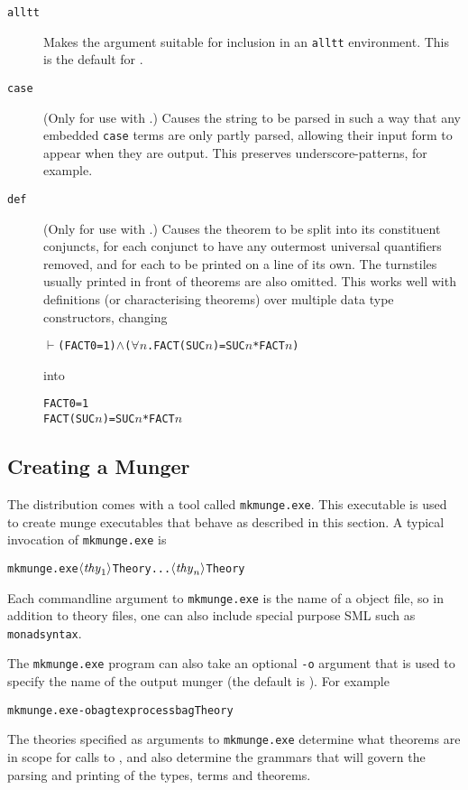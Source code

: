 \begin{description}
\item[\texttt{alltt}] Makes the argument suitable for inclusion in an \texttt{alltt} environment.
%
This is the default for \holthm.
\item[\texttt{case}] (Only for use with \holtm.)
%
Causes the string to be parsed in such a way that any embedded \texttt{case} terms are only partly parsed, allowing their input form to appear when they are output.
%
This preserves underscore-patterns, for example.
\item[\texttt{def}] (Only for use with \holthm.)
%
Causes the theorem to be split into its constituent conjuncts, for each conjunct to have any outermost universal quantifiers removed, and for each to be printed on a line of its own.
%
The turnstiles usually printed in front of theorems are also omitted.
%
This works well with definitions (or characterising theorems) over multiple data type constructors, changing
\begin{alltt}
\(\vdash\) (FACT 0 = 1) \(\land\) (\(\forall\)\ensuremath{n}. FACT (SUC \ensuremath{n}) = SUC \ensuremath{n} * FACT \ensuremath{n})
\end{alltt}
into
\begin{alltt}
   FACT 0 = 1
   FACT (SUC \ensuremath{n}) = SUC \ensuremath{n} * FACT \ensuremath{n}
\end{alltt}
\end{description}


\subsection{Creating a Munger}
\label{sec:munger-creation}

\newcommand{\mkmunge}{\texttt{mkmunge.exe}}
%
The \HOL{} distribution comes with a tool called \mkmunge.
%
This executable is used to create munge executables that behave as described in this section.
%
A typical invocation of \mkmunge{} is
\begin{alltt}
   \mkmunge \(\langle\mathit{thy}\sb{1}\rangle\)Theory ... \(\langle\mathit{thy}\sb{n}\rangle\)Theory
\end{alltt}
Each commandline argument to \mkmunge{} is the name of a \HOL{} object file, so in addition to theory files, one can also include special purpose SML such as \texttt{monadsyntax}.

The \mkmunge{} program can also take an optional \texttt{-o} argument that is used to specify the name of the output munger (the default is \munge).  For example
\begin{alltt}
   \mkmunge -o bagtexprocess bagTheory
\end{alltt}

The theories specified as arguments to \mkmunge{} determine what theorems are in scope for calls to \holthm, and also determine the grammars that will govern the parsing and printing of the \HOL{} types, terms and theorems.




